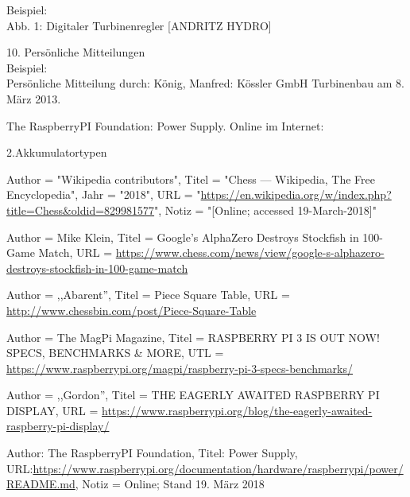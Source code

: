 \documentclass[12pt,a4paper]{article}
\begin{document}
{{{{\begin{description*}
		[z.B. Download, Scannen) in die Diplomarbeit eingefügt,
		so ist unmittelbar darunter die Quelle anzugeben.
		\\[1mm]Beispiel:
		\\Abb. 1: Digitaler Turbinenregler [ANDRITZ HYDRO]
		\vspace*{2mm}
	\item[10. Persönliche Mitteilungen]\hfill
		\\[1mm]Beispiel:
		\\Persönliche Mitteilung durch: König, Manfred:
		Kössler GmbH Turbinenbau am 8. März 2013.
	\item[]{The RaspberryPI Foundation: Power Supply. Online im Internet: }
	\item[2.Akkumulatortypen]{
 	}
	\end{description*}
	}}%
	}

\begingroup
\renewcommand{\section}[2]{}
\begin{thebibliography}{}
    Author = "Wikipedia contributors",
    Titel = "Chess --- Wikipedia{,} The Free Encyclopedia",
    Jahr = "2018",
    URL = "\url{https://en.wikipedia.org/w/index.php?title=Chess&oldid=829981577}",
    Notiz = "[Online; accessed 19-March-2018]"
    
    	Author = Mike Klein, Titel = Google's AlphaZero Destroys Stockfish in 100-Game Match, 
    	URL = \url{https://www.chess.com/news/view/google-s-alphazero-destroys-stockfish-in-100-game-match}
	
	Author = ,,Abarent'', Titel = Piece Square Table, URL = \url{http://www.chessbin.com/post/Piece-Square-Table}    	
	
	Author = The MagPi Magazine, Titel = RASPBERRY PI 3 IS OUT NOW! SPECS, BENCHMARKS \& MORE, 
	UTL = \url{https://www.raspberrypi.org/magpi/raspberry-pi-3-specs-benchmarks/}
	
	Author = ,,Gordon'', Titel = THE EAGERLY AWAITED RASPBERRY PI DISPLAY, 
	URL = \url{https://www.raspberrypi.org/blog/the-eagerly-awaited-raspberry-pi-display/}
    	
		Author: The RaspberryPI Foundation, Titel: Power Supply,
		URL:\url{https://www.raspberrypi.org/documentation/hardware/raspberrypi/power/README.md},
		Notiz = Online; Stand 19. März 2018
		

\end{thebibliography}}
\end{document}

